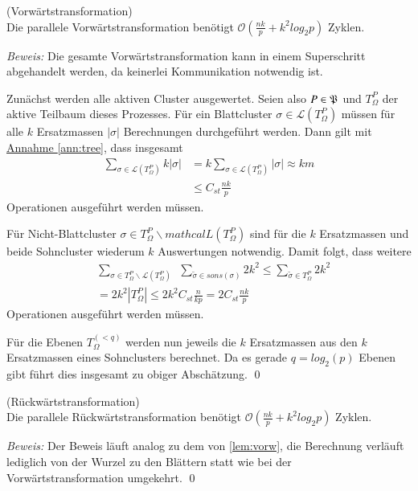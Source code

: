   \begin{lem}
  \label{lem:vorw}
    (Vorwärtstransformation)\\
    Die parallele Vorwärtstransformation benötigt $\mathcal{O}(\frac{nk}{p}+k^2log_2p)$ Zyklen.
  \end{lem}
  
  \textit{Beweis:} 
  Die gesamte Vorwärtstransformation kann in einem Superschritt abgehandelt werden, da keinerlei Kommunikation notwendig ist. 
  
  Zunächst werden alle aktiven Cluster ausgewertet. Seien also $P \in \mathfrak{P}$ und $T_\Omega^P$ der aktive Teilbaum dieses Prozesses. Für ein Blattcluster $\sigma \in \mathcal{L}(T_\Omega^P)$ müssen 
  für alle $k$ Ersatzmassen $|\sigma|$ Berechnungen durchgeführt werden.  
  Dann gilt  mit \hyperref[ann:tree]{Annahme }\ref{ann:tree}, dass insgesamt
  \begin{align*}
    \sum_{\sigma \in \mathcal{L}(T_\Omega^P)} k|\sigma| &= k\sum_{\sigma \in \mathcal{L}(T_\Omega^P)} |\sigma| \approx k m\\
    &\leq C_{st}\frac{nk}{p}
  \end{align*}
  Operationen ausgeführt werden müssen.
  
  Für Nicht-Blattcluster $\sigma \in T_\Omega^P \backslash mathcal{L}(T_\Omega^P)$ sind für die $k$ Ersatzmassen und beide Sohncluster wiederum $k$ Auswertungen notwendig. Damit folgt, dass weitere
  \begin{align*}
    &\sum_{\sigma \in T_\Omega^P \backslash \mathcal{L}(T_\Omega^P)} \ \ \sum_{\tilde \sigma \in sons(\sigma)} 2k^2 \leq \sum_{\tilde \sigma \in T_\Omega^P} 2k^2\\
    &= 2k^2 |T_\Omega^P| \leq 2k^2 C_{st} \frac{n}{kp} = 2C_{st}\frac{nk}{p}
  \end{align*}
  Operationen ausgeführt werden müssen.
  
  Für die Ebenen $T_\Omega^{(<q)}$ werden nun jeweils die $k$ Ersatzmassen aus den $k$ Ersatzmassen eines Sohnclusters berechnet. Da es gerade $q = log_2(p)$ Ebenen gibt führt dies insgesamt zu obiger
  Abschätzung. \qed
  
  \begin{lem}
  \label{lem:ruckw}
    (Rückwärtstransformation)\\
    Die parallele Rückwärtstransformation benötigt $\mathcal{O}(\frac{nk}{p}+k^2log_2p)$ Zyklen.
  \end{lem}
  
  \textit{Beweis:}
  Der Beweis läuft analog zu dem von \autoref{lem:vorw}, die Berechnung verläuft lediglich von der Wurzel zu den Blättern statt wie bei der Vorwärtstransformation umgekehrt. \qed
  
